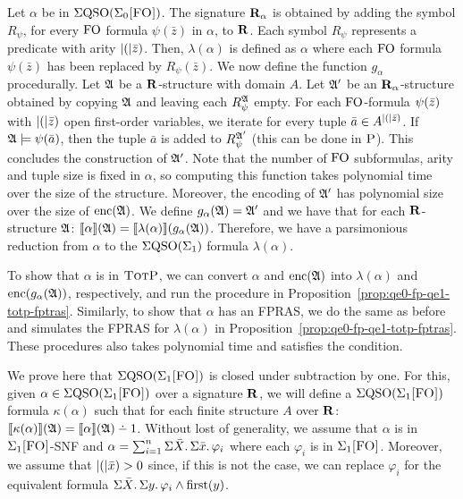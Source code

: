 Let $\alpha$ be in $\Sigma{\rm QSO}(\Sigma_{0}\textsc{[FO]})$. The signature $\mathbf{R}_{\alpha}$ is obtained by adding the symbol $R_{\psi}$, for every ${\rm FO}$ formula $\psi(\bar{z})$ in $\alpha$, to $\mathbf{R}$. Each symbol $R_{\psi}$ represents a predicate with arity $\vert ( \vert\bar{z})$. Then, $\lambda(\alpha)$ is defined as $\alpha$ where each ${\rm FO}$ formula $\psi(\bar{z})$ has been replaced by $R_{\psi}(\bar{z})$. We now define the function $g_{\alpha}$ procedurally. Let $\mathfrak{A}$ be a $\mathbf{R}$-structure with domain $A$. Let $\mathfrak{A}'$ be an $\mathbf{R}_{\alpha}$-structure obtained by copying $\mathfrak{A}$ and leaving each $R_{\psi}^{\mathfrak{A}}$ empty. For each ${\rm FO}$-formula $\psi(\bar{z})$ with $\vert ( \vert\bar{z})$ open first-order variables, we iterate for every tuple $\bar{a} \in A^{\vert ( \vert\bar{z})}$. If $\mathfrak{A}\models\psi(\bar{a})$, then the tuple $\bar{a}$ is added to $R_{\psi}^{\mathfrak{A}'}$ (this can be done in $\text{\sc P}$). This concludes the construction of $\mathfrak{A}'$. Note that the number of ${\rm FO}$ subformulas, arity and tuple size is fixed in $\alpha$, so computing this function takes polynomial time over the size of the structure. Moreover, the encoding of $\mathfrak{A}'$ has polynomial size over the size of ${\rm enc}(\mathfrak{A})$. We define $g_{\alpha}(\mathfrak{A}) = \mathfrak{A}'$ and we have that for each $\mathbf{R}$-structure $\mathfrak{A}$: ${\llbracket{}{\alpha}\rrbracket}(\mathfrak{A}) = {\llbracket{}{\lambda(\alpha)}\rrbracket}(g_{\alpha}(\mathfrak{A}))$. Therefore, we have a parsimonious reduction from $\alpha$ to the $\Sigma{\rm QSO}(\Sigma_{1})$ formula $\lambda(\alpha)$.

To show that $\alpha$ is in $\text{\sc TotP}$, we can convert $\alpha$ and ${\rm enc}(\mathfrak{A})$ into $\lambda(\alpha)$ and ${\rm enc}(g_{\alpha}(\mathfrak{A}))$, respectively, and run the procedure in Proposition~\ref{prop:qe0-fp-qe1-totp-fptras}. Similarly, to show that $\alpha$ has an FPRAS, we do the same as before and simulates the FPRAS for $\lambda(\alpha)$ in Proposition~\ref{prop:qe0-fp-qe1-totp-fptras}. These procedures also takes polynomial time and satisfies the condition.

\vspace{1em}
 We prove here that $\Sigma{\rm QSO}(\Sigma_{1}\textsc{[FO]})$ is closed under subtraction by one. 
For this, given $\alpha \in \Sigma{\rm QSO}(\Sigma_{1}\textsc{[FO]})$ over a signature $\mathbf{R}$, we will define a $\Sigma{\rm QSO}(\Sigma_{1}\textsc{[FO]})$ formula $\kappa(\alpha)$ such that for each finite structure $A$ over $\mathbf{R}$: $\sem{\kappa(\alpha)}(\A) = \sem{\alpha}(\A) \dotminus 1$. 
Without lost of generality, we assume that $\alpha$ is in $\Sigma_{1}\textsc{[FO]}$-SNF and $\alpha = \sum_{i = 1}^{n}\Sigma{\bar{X}}.\,\Sigma{\bar{x}}.\,\varphi_i$ where each $\varphi_i$ is in $\Sigma_{1}\textsc{[FO]}$. Moreover, we assume that $\vert ( \vert\bar{x}) > 0$  since, if this is not the case, we can replace $\varphi_i$ for the equivalent formula $\Sigma{\bar{X}}.\, \Sigma{y}.\, \varphi_i \wedge\operatorname{first}(y)$.

